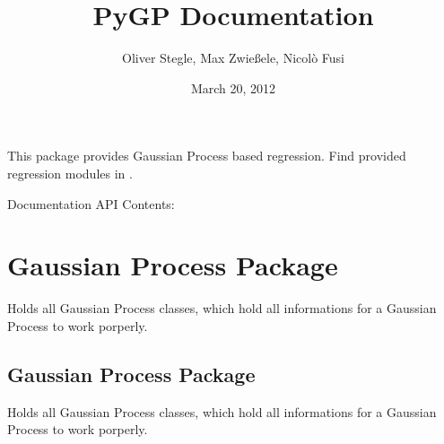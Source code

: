 \documentclass[letterpaper,10pt,english]{sphinxmanual}
\title{PyGP Documentation}
\date{March 20, 2012}
\author{Oliver Stegle, Max Zwießele, Nicolò Fusi}
\begin{document}
\maketitle
\tableofcontents
{}\label{index::doc}


This package provides Gaussian Process based regression.
Find provided regression modules in {\hyperref[gp:module-pygp.gp]{}}.

Documentation API Contents:
\label{gp:module-pygp.gp}

\chapter{Gaussian Process Package}
\label{gp::doc}\label{gp:welcome-to-pygp}\label{gp:gaussian-process-package}
Holds all Gaussian Process classes, which hold all informations for a Gaussian Process to work porperly.
\label{gp:module-pygp.gp.gp_base}

\section{Gaussian Process Package}
\label{gp:id1}
Holds all Gaussian Process classes, which hold all informations for a Gaussian Process to work porperly.
\end{document}
